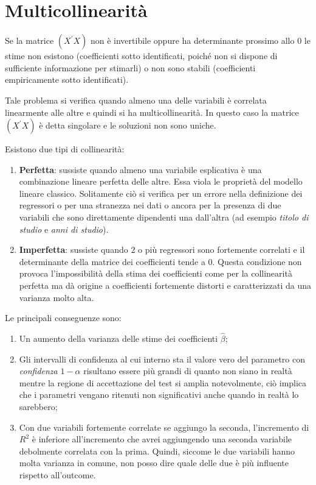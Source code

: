 \documentclass[a4page, 11pt]{article} %
\begin{document}
\section{Multicollinearità }

Se la matrice $(X^{\prime} X)$ non è invertibile oppure ha determinante prossimo allo 0 le stime non esistono (coefficienti sotto identificati, poiché non si dispone di sufficiente informazione per stimarli) o non sono stabili (coefficienti empiricamente sotto identificati).

Tale problema si verifica quando almeno una delle variabili è correlata linearmente alle altre e quindi si ha multicollinearità. In questo caso la matrice $(X^{\prime} X)$ è detta singolare e le soluzioni non sono uniche. 

Esistono due tipi di collinearità:
\begin{enumerate}[noitemsep]
\item \textbf{Perfetta}: sussiste quando almeno una variabile esplicativa è una combinazione lineare perfetta delle altre. Essa viola le proprietà del modello lineare classico. Solitamente ciò si verifica per un errore nella definizione dei regressori o per una stranezza nei dati o ancora per la presenza di due variabili che sono direttamente dipendenti una dall'altra (ad esempio \textit{titolo di studio} e \textit{anni di studio}).
\item \textbf{Imperfetta}: sussiste quando $2$ o più regressori sono fortemente correlati e il determinante della matrice dei coefficienti tende a $0$. Questa condizione non provoca l'impossibilità della stima dei coefficienti come per la collinearità perfetta ma dà origine a coefficienti fortemente distorti e caratterizzati da una varianza molto alta.
\end{enumerate}
Le principali conseguenze sono:
\begin{enumerate}[noitemsep]
\item Un aumento della varianza delle stime dei coefficienti $\hat{\beta}$;
\item Gli intervalli di confidenza al cui interno sta il valore vero del parametro con \textit{confidenza} $1-\alpha$ risultano essere più grandi di quanto non siano in realtà mentre la regione di accettazione del test si amplia notevolmente, ciò implica che i parametri vengano ritenuti non significativi anche quando in realtà lo sarebbero;
\item Con due variabili fortemente correlate se aggiungo la seconda, l’incremento di $R^{2}$ è inferiore all’incremento che avrei aggiungendo una seconda variabile debolmente correlata con la prima. Quindi, siccome le due variabili hanno molta varianza in comune, non posso dire quale delle due è più influente rispetto all’outcome.
\end{enumerate}
\end{document}
